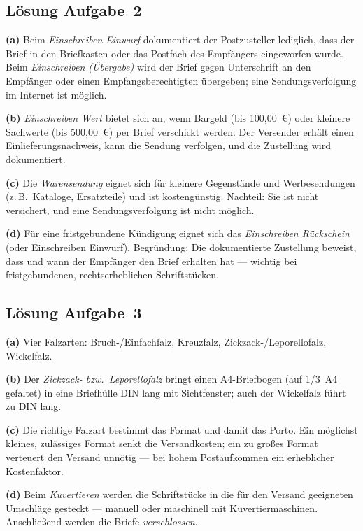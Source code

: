 \documentclass[11pt, a4paper]{article}
\begin{document}
\subsection*{Lösung Aufgabe~2}
\begin{loesung}
\textbf{(a)} Beim \emph{Einschreiben Einwurf} dokumentiert der Postzusteller lediglich,
dass der Brief in den Briefkasten oder das Postfach des Empfängers eingeworfen wurde.
Beim \emph{Einschreiben (Übergabe)} wird der Brief gegen Unterschrift an den Empfänger
oder einen Empfangsberechtigten übergeben; eine Sendungsverfolgung im Internet ist
möglich.

\textbf{(b)} \emph{Einschreiben Wert} bietet sich an, wenn Bargeld (bis 100,00~€) oder
kleinere Sachwerte (bis 500,00~€) per Brief verschickt werden. Der Versender erhält einen
Einlieferungsnachweis, kann die Sendung verfolgen, und die Zustellung wird dokumentiert.

\textbf{(c)} Die \emph{Warensendung} eignet sich für kleinere Gegenstände und
Werbesendungen (z.\,B.\ Kataloge, Ersatzteile) und ist kostengünstig. Nachteil: Sie ist
nicht versichert, und eine Sendungsverfolgung ist nicht möglich.

\textbf{(d)} Für eine fristgebundene Kündigung eignet sich das \emph{Einschreiben
Rückschein} (oder Einschreiben Einwurf). Begründung: Die dokumentierte Zustellung
beweist, dass und wann der Empfänger den Brief erhalten hat --- wichtig bei
fristgebundenen, rechtserheblichen Schriftstücken.
\end{loesung}

\subsection*{Lösung Aufgabe~3}
\begin{loesung}
\textbf{(a)} Vier Falzarten: Bruch-/Einfachfalz, Kreuzfalz, Zickzack-/Leporellofalz,
Wickelfalz.

\textbf{(b)} Der \emph{Zickzack- bzw.\ Leporellofalz} bringt einen A4-Briefbogen (auf
1/3~A4 gefaltet) in eine Briefhülle DIN lang mit Sichtfenster; auch der Wickelfalz führt
zu DIN lang.

\textbf{(c)} Die richtige Falzart bestimmt das Format und damit das Porto. Ein möglichst
kleines, zulässiges Format senkt die Versandkosten; ein zu großes Format verteuert den
Versand unnötig --- bei hohem Postaufkommen ein erheblicher Kostenfaktor.

\textbf{(d)} Beim \emph{Kuvertieren} werden die Schriftstücke in die für den Versand
geeigneten Umschläge gesteckt --- manuell oder maschinell mit Kuvertiermaschinen.
Anschließend werden die Briefe \emph{verschlossen}.
\end{loesung}
\end{document}
